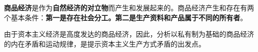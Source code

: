 \textbf{{商品经济}}是作为\textbf{自然经济的对立物}而产生和发展起来的。商品经济产生和存在有两个基本条件：\textbf{第一是存在社会分工。第二是生产资料和产品属于不同的所有者}。

{由于资本主义经济是高度发达的商品经济，因此，分析以私有制为基础的商品经济的内在矛盾和运动规律，是提示资本主义生产方式矛盾的出发点。}
